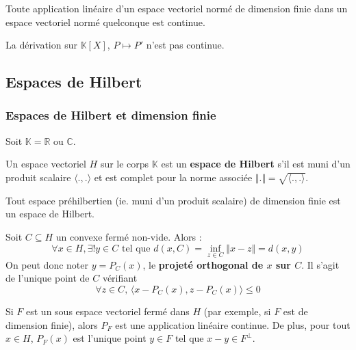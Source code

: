 	\begin{proposition}
		Toute application linéaire d'un espace vectoriel normé de dimension finie dans un espace vectoriel normé quelconque est continue.
	\end{proposition}
	
	\begin{cexample}
		La dérivation sur $\mathbb{K}[X]$, $P \mapsto P'$ n'est pas continue.
	\end{cexample}
	
	\subsection{Espaces de Hilbert}
	
	\subsubsection{Espaces de Hilbert et dimension finie}
	
	
	Soit $\mathbb{K} = \mathbb{R}$ ou $\mathbb{C}$.
	
	\begin{definition}
		Un espace vectoriel $H$ sur le corps $\mathbb{K}$ est un \textbf{espace de Hilbert} s'il est muni d'un produit scalaire $\langle . , . \rangle$ et est complet pour la norme associée $\Vert . \Vert = \sqrt{\langle . , . \rangle}$.
	\end{definition}
	
	\begin{example}
		Tout espace préhilbertien (ie. muni d'un produit scalaire) de dimension finie est un espace de Hilbert.
	\end{example}
	
	\begin{theorem}
		Soit $C \subseteq H$ un convexe fermé non-vide. Alors :
		\[ \forall x \in H, \exists! y \in C \text{ tel que } d(x, C) = \inf_{z \in C} \Vert x - z \Vert = d(x, y) \]
		On peut donc noter $y = P_C(x)$, le \textbf{projeté orthogonal de $x$ sur $C$}. Il s'agit de l'unique point de $C$ vérifiant
		\[ \forall z \in C, \, \langle x - P_C(x), z - P_C(x) \rangle \leq 0 \]
	\end{theorem}
	
	\begin{theorem}
		Si $F$ est un sous espace vectoriel fermé dans $H$ (par exemple, si $F$ est de dimension finie), alors $P_F$ est une application linéaire continue. De plus, pour tout $x \in H$, $P_F(x)$ est l'unique point $y \in F$ tel que $x-y \in F^\perp$.
	\end{theorem}
	

